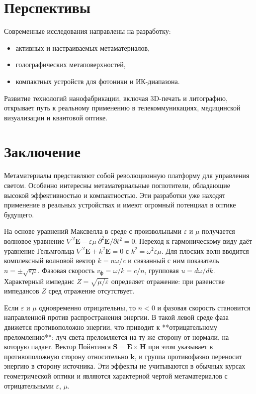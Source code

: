 \documentclass[a4paper,12pt]{article}
\begin{document}
\section*{Перспективы}

Современные исследования направлены на разработку:
\begin{itemize}
    \item активных и настраиваемых метаматериалов,
    \item голографических метаповерхностей,
    \item компактных устройств для фотоники и ИК-диапазона.
\end{itemize}

Развитие технологий нанофабрикации, включая 3D-печать и литографию, открывает путь к реальному применению в телекоммуникациях, медицинской визуализации и квантовой оптике.

\section*{Заключение}

Метаматериалы представляют собой революционную платформу для управления светом. Особенно интересны метаматериальные поглотители, обладающие высокой эффективностью и компактностью. Эти разработки уже находят применение в реальных устройствах и имеют огромный потенциал в оптике будущего.

На основе уравнений Максвелла в среде с произвольными $\varepsilon$ и $\mu$ получается волновое уравнение $\nabla^2\mathbf{E}-\varepsilon\mu \ \partial^2\mathbf{E}/\partial t^2=0$. Переход к гармоническому виду даёт уравнение Гельмгольца $\nabla^2\mathbf{E}+k^2\mathbf{E}=0$ с $k^2=\omega^2\varepsilon\mu$. Для плоских волн вводится комплексный волновой вектор $k=n\omega/c$ и связанный с ним показатель $n=\pm\sqrt{\varepsilon\mu}$. Фазовая скорость $v_{\text{ф}}=\omega/k=c/n$, групповая $u=d\omega/dk$. Характерный импеданс $Z=\sqrt{\mu/\varepsilon}$ определяет отражение: при равенстве импедансов $Z$ сред отражение отсутствует.

Если $\varepsilon$ и $\mu$ одновременно отрицательны, то $n<0$ и фазовая скорость становится направленной против распространения энергии. В такой левой среде фаза движется противоположно энергии, что приводит к **отрицательному преломлению**: луч света преломляется на ту же сторону от нормали, на которую падает. Вектор Пойнтинга $\mathbf{S}=\mathbf{E}\times\mathbf{H}$ при этом указывает в противоположную сторону относительно $\mathbf{k}$, и группа противофазно переносит энергию в сторону источника. Эти эффекты не учитываются в обычных курсах геометрической оптики и являются характерной чертой метаматериалов с отрицательными $\varepsilon$, $\mu$.
\end{document}
